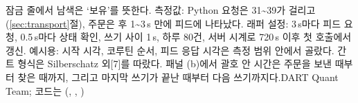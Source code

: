 {}{잠금 줄에서 남색은 ‘보유’를 뜻한다. 측정값: Python 요청은 31\textasciitilde 39\ms{}가 걸리고(\ref{sec:transport}절), 주문은  후 1\textasciitilde 3\,s 만에 피드에 나타났다. 래퍼 설정: 3\,s마다 피드 요청, 0.5\,s마다 상태 확인, 쓰기 사이 1\,s, 하루 80건, 서버 시계로 720\,s 이후 첫 호출에서 갱신. 예시용: 시작 시각, 코루틴 순서, 피드 응답 시각은 측정 범위 안에서 골랐다. 간트 형식은 Silberschatz 외[7]를 따랐다. 패널 (b)에서 괄호 안 시간은 주문을 보낸 때부터 찾은 때까지, 그리고 마지막 쓰기가 끝난 때부터 다음 쓰기까지다.}{DART Quant Team; 코드는  (, , )}
